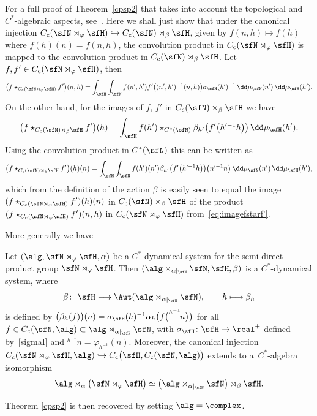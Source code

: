 For a full
proof of Theorem~\ref{cpsp2} that takes into account the topological
and $C^*$-algebraic aspects, see~\cite[Proposition~3.11]{Williams2007}. Here
we shall just show that under the canonical injection $C_{\rm c}(\sfN \rtimes_\varphi \sfH )\hookrightarrow
C_{\rm c}(\sfN )\rtimes_\beta \sfH $, given by $f(n,h)\mapsto f(h)$ where
$f(h)(n)=f(n,h)$, the convolution product in $C_{\rm c}(\sfN \rtimes_\varphi
\sfH )$ is mapped to the convolution product in $C_{\rm c}(\sfN )\rtimes_\beta \sfH $.
Let $f,f'\in C_{\rm c}(\sfN \rtimes_\varphi \sfH )$, then
\begin{gather}\label{eq:imagefstarf'}
\big(f\star_{C_{\rm c}(\sfN \rtimes_\varphi
 \sfH )}f'\big)(n,h)=\int_\sfH \int_\sfN f(n',h')
f'\big((n',h')^{-1} (n,h)\big) \sigma_\sfH(h')^{-1} \, \dd\mu_\sfN (n') \, \dd\mu_\sfH (h').
\end{gather}
On the other hand, for the images of $f$, $f'$ in $C_{\rm c}(\sfN
)\rtimes_\beta \sfH $ we have
\[
\big(f\star_{C_{\rm c}(\sfN )\rtimes_\beta
 \sfH }f'\big)(h)=\int_\sfH f(h')\star_{C^*(\sfN
 )}\beta_{h'}\big(f'\big(h'^{-1} h\big)\big) \, \dd\mu_\sfH (h') .
\]
Using the convolution product in $C^*(\sfN)$ this can be written as
\begin{align*}
\big(f\star_{C_{\rm c}(\sfN )\rtimes_\beta
 \sfH }f'\big)(h)(n)=\int_\sfH \int_\sfN
 f(h')(n') \beta_{h'}\big(f'\big(h'^{-1} h\big)\big)\big(n'^{-1} n\big)
\, \dd\mu_\sfN (n') \, \dd\mu_\sfH (h') ,
\end{align*}
which from the definition of the action $\beta$ is easily seen to
equal the image $(f\star_{C_{\rm c}(\sfN \rtimes_\varphi \sfH
 )}f')(h)(n)$ in $C_{\rm c}(\sfN )\rtimes_\beta
 \sfH $ of the product $(f\star_{C_{\rm c}(\sfN \rtimes_\varphi
 \sfH )}f')(n,h)$ in $C_{\rm c}(\sfN \rtimes_\varphi
\sfH )$ from~\eqref{eq:imagefstarf'}.

More generally we have~\cite[Proposition~3.11]{Williams2007}
\begin{Theorem}\label{cpsp3}
Let $(\alg,\sfN \rtimes_\varphi \sfH ,\alpha)$ be a $C^*$-dynamical
system for the semi-direct product group $\sfN \rtimes_\varphi \sfH $. Then $(\alg\rtimes_{\alpha|_\sfN }\sfN ,\sfH ,\beta)$ is a $C^*$-dynamical
system, where
\[
\beta\colon \ \sfH \longrightarrow \Aut(\alg\rtimes_{\alpha|_\sfN }\sfN ) ,
\qquad h\longmapsto \beta_h
\]
is defined by
$\big(\beta_h(f)\big)(n)=\sigma_\sfH(h)^{-1} \alpha_h\big(f\big(^{h^{-1\!}}n\big)\big)$
for all $f\in C_{\rm c}(\sfN ,\alg)\subset \alg\rtimes_{\alpha|_\sfN }\sfN $, with $\sigma_\sfH\colon
\sfH \to \real^+$ defined by~\eqref{sigmaI} and $^{h^{-1\!}}n=\varphi_{h^{-1}}(n)$.
Moreover, the canonical injection $C_{\rm c}(\sfN \rtimes_\varphi \sfH ,\alg)\hookrightarrow
C_{\rm c}\big(\sfH ,C_{\rm c}(\sfN ,\alg)\big)$
extends to a~$C^*$-algebra isomorphism
\[
\alg\rtimes_{\alpha}\big(\sfN \rtimes_\varphi
\sfH \big) \simeq \big(\alg\rtimes_{\alpha|_\sfN } \sfN
\big)\rtimes_\beta \sfH .
\]
\end{Theorem}

Theorem \ref{cpsp2} is then recovered by setting $\alg=\complex$.

